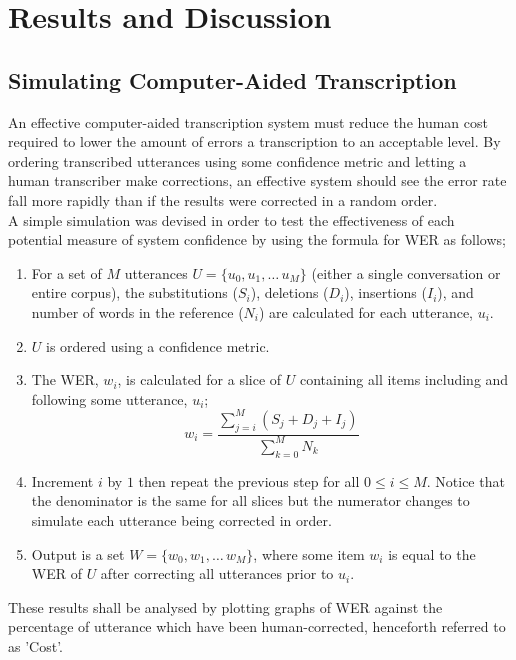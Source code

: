 \chapter{Results and Discussion}\label{ch:results-and-discussion}

\section{Simulating Computer-Aided Transcription}\label{sec:simulating-transcription}

An effective computer-aided transcription system must reduce the human cost required to lower the amount of errors a transcription to an acceptable level.
By ordering transcribed utterances using some confidence metric and letting a human transcriber make corrections, an effective system should see the error rate fall more rapidly than if the results were corrected in a random order. \\

A simple simulation was devised in order to test the effectiveness of each potential measure of system confidence by using the formula for WER as follows;

\begin{enumerate}
  \item For a set of $M$ utterances $U = \{ u_{0}, u_{1}, \ldots\, u_{M} \}$ (either a single conversation or entire corpus), the substitutions ($S_i$), deletions ($D_i$), insertions ($I_i$), and number of words in the reference ($N_i$) are calculated for each utterance, $u_i$.
  \item $U$ is ordered using a confidence metric.
  \item The WER, $w_i$, is calculated for a slice of $U$ containing all items including and following some utterance, $u_i$;
    \[
      w_i = \frac{\sum_{j=i}^{M} (S_j + D_j + I_j)}{\sum_{k=0}^{M} N_k}
    \]
  \item Increment $i$ by $1$ then repeat the previous step for all $0 \leq i \leq M$.
    Notice that the denominator is the same for all slices but the numerator changes to simulate each utterance being corrected in order.
  \item Output is a set $W = \{ w_{0}, w_{1}, \ldots\, w_{M} \}$, where some item $w_{i}$ is equal to the WER of $U$ after correcting all utterances prior to $u_i$.
\end{enumerate}

These results shall be analysed by plotting graphs of WER against the percentage of utterance which have been human-corrected, henceforth referred to as 'Cost'.

